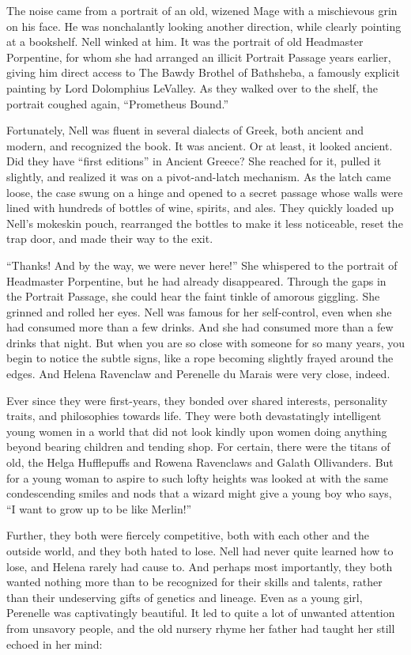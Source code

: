 The noise came from a portrait of an old, wizened Mage with a mischievous grin on his face. He was nonchalantly looking another direction, while clearly pointing at a bookshelf. Nell winked at him. It was the portrait of old Headmaster Porpentine, for whom she had arranged an illicit Portrait Passage years earlier, giving him direct access to The Bawdy Brothel of Bathsheba, a famously explicit painting by Lord Dolomphius LeValley. As they walked over to the shelf, the portrait coughed again, “Prometheus Bound.”

Fortunately, Nell was fluent in several dialects of Greek, both ancient and modern, and recognized the book. It was ancient. Or at least, it looked ancient. Did they have “first editions” in Ancient Greece? She reached for it, pulled it slightly, and realized it was on a pivot-and-latch mechanism. As the latch came loose, the case swung on a hinge and opened to a secret passage whose walls were lined with hundreds of bottles of wine, spirits, and ales. They quickly loaded up Nell’s mokeskin pouch, rearranged the bottles to make it less noticeable, reset the trap door, and made their way to the exit.

“Thanks! And by the way, we were never here!” She whispered to the portrait of Headmaster Porpentine, but he had already disappeared. Through the gaps in the Portrait Passage, she could hear the faint tinkle of amorous giggling. She grinned and rolled her eyes.
\simpleline
Nell was famous for her self-control, even when she had consumed more than a few drinks. And she had consumed more than a few drinks that night. But when you are so close with someone for so many years, you begin to notice the subtle signs, like a rope becoming slightly frayed around the edges. And Helena Ravenclaw and Perenelle du Marais were very close, indeed.

Ever since they were first-years, they bonded over shared interests, personality traits, and philosophies towards life. They were both devastatingly intelligent young women in a world that did not look kindly upon women doing anything beyond bearing children and tending shop. For certain, there were the titans of old, the Helga Hufflepuffs and Rowena Ravenclaws and Galath Ollivanders. But for a young woman to aspire to such lofty heights was looked at with the same condescending smiles and nods that a wizard might give a young boy who says, “I want to grow up to be like Merlin!”

Further, they both were fiercely competitive, both with each other and the outside world, and they both hated to lose. Nell had never quite learned how to lose, and Helena rarely had cause to. And perhaps most importantly, they both wanted nothing more than to be recognized for their skills and talents, rather than their undeserving gifts of genetics and lineage. Even as a young girl, Perenelle was captivatingly beautiful. It led to quite a lot of unwanted attention from unsavory people, and the old nursery rhyme her father had taught her still echoed in her mind:

